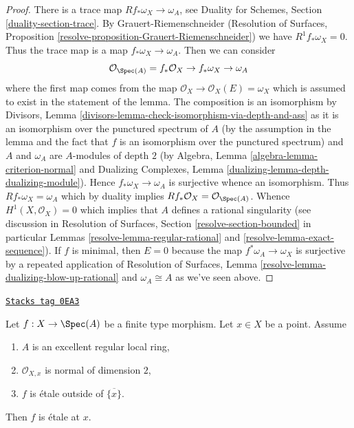 \begin{proof}
There is a trace map $Rf_*\omega_X \to \omega_A$, see
Duality for Schemes, Section \ref{duality-section-trace}.
By Grauert-Riemenschneider
(Resolution of Surfaces,
Proposition \ref{resolve-proposition-Grauert-Riemenschneider})
we have $R^1f_*\omega_X = 0$.
Thus the trace map is a map $f_*\omega_X \to \omega_A$.
Then we can consider
$$
\mathcal{O}_{\Spec(A)} = f_*\mathcal{O}_X \to f_*\omega_X \to \omega_A
$$
where the first map comes from the map
$\mathcal{O}_X \to \mathcal{O}_X(E) = \omega_X$ which is
assumed to exist in the statement of the lemma.
The composition is an isomorphism by Divisors, Lemma
\ref{divisors-lemma-check-isomorphism-via-depth-and-ass}
as it is an isomorphism over the punctured spectrum of $A$
(by the assumption in the lemma and the fact that $f$ is an isomorphism
over the punctured spectrum) and $A$ and $\omega_A$
are $A$-modules of depth $2$ (by
Algebra, Lemma \ref{algebra-lemma-criterion-normal} and
Dualizing Complexes, Lemma \ref{dualizing-lemma-depth-dualizing-module}).
Hence $f_*\omega_X \to \omega_A$ is surjective whence an isomorphism.
Thus $Rf_*\omega_X = \omega_A$ which by duality implies
$Rf_*\mathcal{O}_X = \mathcal{O}_{\Spec(A)}$.
Whence $H^1(X, \mathcal{O}_X) = 0$ which implies that $A$
defines a rational singularity (see discussion in
Resolution of Surfaces, Section
\ref{resolve-section-bounded} in particular
Lemmas \ref{resolve-lemma-regular-rational} and
\ref{resolve-lemma-exact-sequence}).
If $f$ is minimal, then $E = 0$ because the map
$f^*\omega_A \to \omega_X$ is surjective by
a repeated application of Resolution of Surfaces, Lemma
\ref{resolve-lemma-dualizing-blow-up-rational}
and $\omega_A \cong A$ as we've seen above.
\end{proof}

\begin{lemma}
\label{pione-lemma-key-purity-ramification}
\href{https://stacks.math.columbia.edu/tag/0EA3}{\texttt{Stacks tag 0EA3}}

Let $f : X \to \Spec(A)$ be a finite type morphism.
Let $x \in X$ be a point. Assume
\begin{enumerate}
\item $A$ is an excellent regular local ring,
\item $\mathcal{O}_{X, x}$ is normal of dimension $2$,
\item $f$ is \'etale outside of $\overline{\{x\}}$.
\end{enumerate}
Then $f$ is \'etale at $x$.
\end{lemma}

